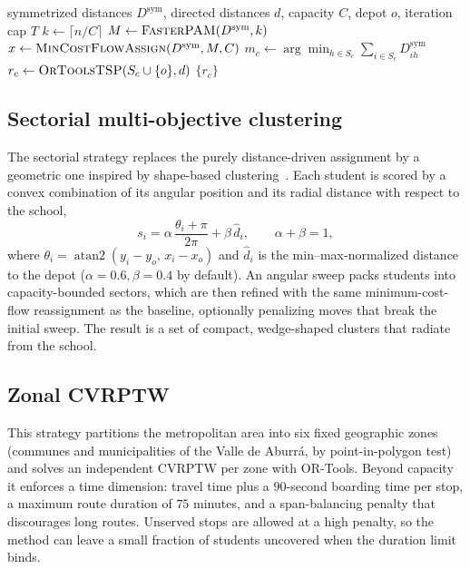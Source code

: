 \documentclass[runningheads]{llncs}
\begin{document}
\begin{algorithm}[t]
\caption{Capacitated k-medoids + per-cluster TSP}
\label{alg:kmedoids}
\footnotesize
\begin{algorithmic}[1]
\Require symmetrized distances $D^{\mathrm{sym}}$, directed distances $d$,
capacity $C$, depot $o$, iteration cap $T$
\State $k \gets \lceil n/C\rceil$
\State $M \gets \textsc{FasterPAM}(D^{\mathrm{sym}},k)$ 
\Repeat
  \State $x \gets \textsc{MinCostFlowAssign}(D^{\mathrm{sym}},M,C)$
     \State $m_c \gets \arg\min_{h\in S_c}\sum_{i\in S_c} D^{\mathrm{sym}}_{ih}$
  \EndFor
{}
  \State $r_c \gets \textsc{OrToolsTSP}(S_c\cup\{o\},d)$ 
\EndFor
\State \Return $\{r_c\}$
\end{algorithmic}
\end{algorithm}

\subsection{Sectorial multi-objective clustering}
The sectorial strategy replaces the
purely distance-driven assignment by a geometric one inspired by
shape-based clustering~\cite{CakirRevisitingProblem}. Each student is
scored by a convex combination of its angular position and its radial
distance with respect to the school,
\begin{equation}
s_i=\alpha\,\frac{\theta_i+\pi}{2\pi}+\beta\,\hat d_i,
\qquad \alpha+\beta=1,
\label{eq:sectorial-score}
\end{equation}
where $\theta_i=\operatorname{atan2}(y_i-y_o,\,x_i-x_o)$ and
$\hat d_i$ is the min--max-normalized distance to the depot
($\alpha=0.6,\beta=0.4$ by default). An angular sweep packs students
into capacity-bounded sectors, which are then refined with the same
minimum-cost-flow reassignment as the baseline, optionally penalizing
moves that break the initial sweep. The result is a set of compact,
wedge-shaped clusters that radiate from the school.


\subsection{Zonal CVRPTW}\label{sec:cvrptw}
This strategy partitions the metropolitan area into six fixed
geographic zones (communes and municipalities of the Valle de
Aburr\'a, by point-in-polygon test) and solves an independent CVRPTW
per zone with OR-Tools. Beyond capacity it enforces a time dimension:
travel time plus a $90$-second boarding time per stop, a maximum route
duration of $75$ minutes, and a span-balancing penalty that
discourages long routes. Unserved stops are allowed at a high penalty,
so the method can leave a small fraction of students uncovered when the
duration limit binds.
\end{document}
